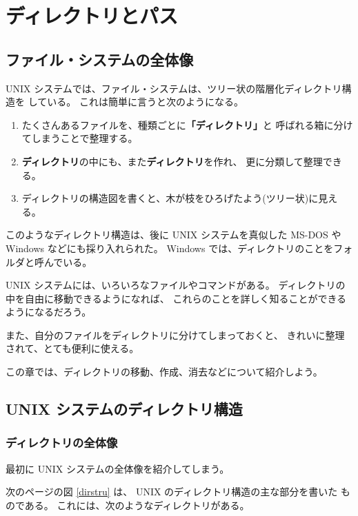 \chapter{ディレクトリとパス}

\section*{ファイル・システムの全体像}

 UNIX システムでは、ファイル・システムは、ツリー状の階層化ディレクトリ構造を
している。
これは簡単に言うと次のようになる。
\begin{enumerate}
\item たくさんあるファイルを、種類ごとに\textbf{「ディレクトリ」}と
呼ばれる箱に分けてしまうことで整理する。
\item \textbf{ディレクトリ}の中にも、また\textbf{ディレクトリ}を作れ、
更に分類して整理できる。
\item ディレクトリの構造図を書くと、木が枝をひろげたよう(ツリー状)に見える。
\end{enumerate}

このようなディレクトリ構造は、後に UNIX システムを真似した MS-DOS や
 Windows などにも採り入れられた。
 Windows では、ディレクトリのことをフォルダと呼んでいる。

\bigskip

 UNIX システムには、いろいろなファイルやコマンドがある。
ディレクトリの中を自由に移動できるようになれば、
これらのことを詳しく知ることができるようになるだろう。

また、自分のファイルをディレクトリに分けてしまっておくと、
きれいに整理されて、とても便利に使える。

この章では、ディレクトリの移動、作成、消去などについて紹介しよう。

\section{UNIX システムのディレクトリ構造}

\subsection{ディレクトリの全体像}

最初に UNIX システムの全体像を紹介してしまう。

次のページの図 \ref{dirstru} は、 UNIX のディレクトリ構造の主な部分を書いた
ものである。
これには、次のようなディレクトリがある。


